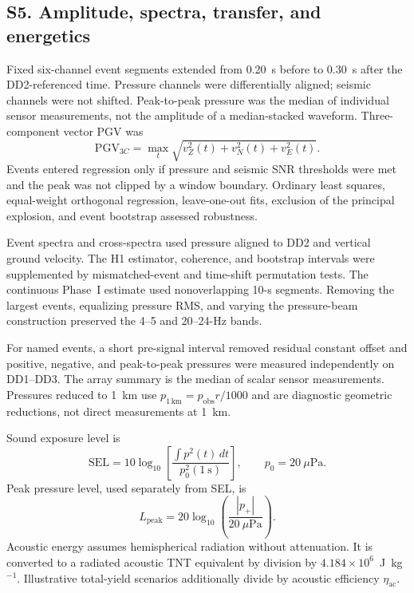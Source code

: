 \documentclass[]{seismica}
\begin{document}
\FloatBarrier
\subsection{S5. Amplitude, spectra, transfer, and energetics}
\label{sec:supp_energy}

Fixed six-channel event segments extended from 0.20~s before to 0.30~s after
the DD2-referenced time. Pressure channels were differentially aligned; seismic
channels were not shifted. Peak-to-peak pressure was the median of individual
sensor measurements, not the amplitude of a median-stacked waveform.
Three-component vector PGV was
\begin{equation}
 \mathrm{PGV}_{3C}=\max_t\sqrt{v_Z^2(t)+v_N^2(t)+v_E^2(t)}.
\end{equation}
Events entered regression only if pressure and seismic SNR thresholds were
met and the peak was not clipped by a window boundary. Ordinary least squares,
equal-weight orthogonal regression, leave-one-out fits, exclusion of the
principal explosion, and event bootstrap assessed robustness.

Event spectra and cross-spectra used pressure aligned to DD2 and vertical
ground velocity. The H1 estimator, coherence, and bootstrap intervals were
supplemented by mismatched-event and time-shift permutation tests. The
continuous Phase~I estimate used nonoverlapping 10-s segments. Removing the
largest events, equalizing pressure RMS, and varying the pressure-beam
construction preserved the 4--5 and 20--24-Hz bands.

For named events, a short pre-signal interval removed residual constant offset
and positive, negative, and peak-to-peak pressures were measured independently
on DD1--DD3. The array summary is the median of scalar sensor measurements.
Pressures reduced to 1~km use $p_{1\,\mathrm{km}}=p_{\mathrm{obs}}r/1000$ and
are diagnostic geometric reductions, not direct measurements at 1~km.

Sound exposure level is
\begin{equation}
 \mathrm{SEL}=10\log_{10}\left[
 \frac{\int p^2(t)\,dt}{p_0^2(1~\mathrm{s})}\right],
 \qquad p_0=20~\mu\mathrm{Pa}.
\end{equation}
Peak pressure level, used separately from SEL, is
\begin{equation}
 L_{\mathrm{peak}}=20\log_{10}\left(\frac{|p_+|}{20~\mu\mathrm{Pa}}\right).
\end{equation}
Acoustic energy assumes hemispherical radiation without attenuation. It is
converted to a radiated acoustic TNT equivalent by division by
$4.184\times10^6$~J~kg$^{-1}$. Illustrative total-yield scenarios additionally
divide by acoustic efficiency $\eta_{\mathrm{ac}}$.
\end{document}
